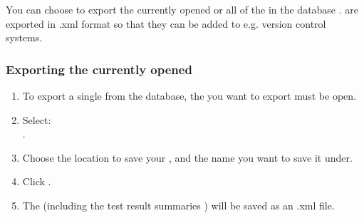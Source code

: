 
 You can choose to export the currently opened \gdproject{}  or all of the \gdprojects{} in the database . \gdprojects{} are exported in .xml format so that they can be added to e.g. version control systems. 


\subsubsection{Exporting the currently opened \gdproject{}}
\label{exportsingle}
\begin{enumerate}
\item To export a single \gdproject{} from the database, the \gdproject{} you want to export must be open.   
\item Select:\\
. 
\item Choose the location to save your \gdproject{}, and the name you want to save it under. 
\item Click . 
\item The \gdproject{} (including the test result summaries ) will be saved as an .xml file. 


\end{enumerate}
